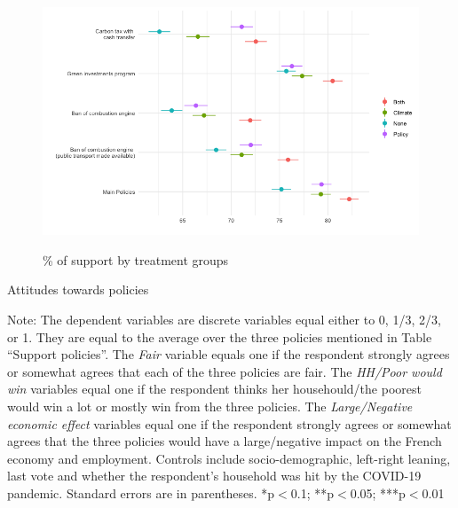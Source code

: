 	\begin{frame}{}%
	\begin{figure}[h!]
	\caption{\% of support by treatment groups} %
	\includegraphics[width=.7\paperwidth]{../figures/country_comparison/support_var_by_treatment_all.png} \\
	\end{figure}
	\end{frame}

	\begin{frame}{}%
	\begin{table}[h!]
	\caption{Attitudes towards policies}
	\begin{center}
	\scalebox{.7}{}
	\end{center}
		{\scriptsize Note: The dependent variables are discrete variables equal either to 0, 1/3, 2/3, or 1. They are equal to the average over the three policies mentioned in Table ``Support policies''. The \textit{Fair} variable equals one if the respondent strongly agrees or somewhat agrees that each of the three policies are fair. The \textit{HH/Poor would win} variables equal one if the respondent thinks her househould/the poorest would win a lot or mostly win from the three policies. The \textit{Large/Negative economic effect} variables equal one if the respondent strongly agrees or somewhat agrees that the three policies would have a large/negative impact on the French economy and employment. 
		\newline Controls include socio-demographic, left-right leaning, last vote and whether the respondent's household was hit by the COVID-19 pandemic. Standard errors are in parentheses. *p$<$0.1; **p$<$0.05; ***p$<$0.01}
	\end{table}
	\end{frame}


